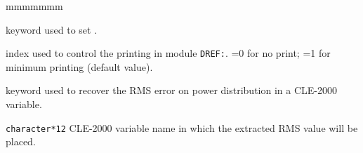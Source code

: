 \begin{ListeDeDescription}{mmmmmmm}
\item[\moc{EDIT}] keyword used to set .

\item[\dusa{iprint}] index used to control the printing in module {\tt DREF:}. =0 for no print; =1 for minimum printing (default value).

\item[\moc{RMS}] keyword used to recover the RMS error on power distribution in a CLE-2000 variable.

\item[\dusa{RMS\_VAL}] {\tt character*12} CLE-2000 variable name in which the extracted RMS value will be placed.

\end{ListeDeDescription}

\eject
